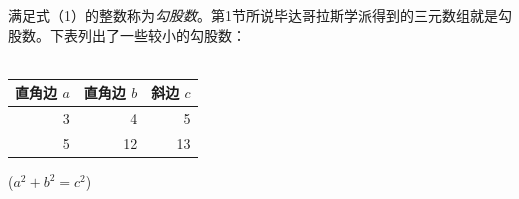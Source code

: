 \documentclass[UTF8,12pt]{ctexart} %
\begin{document}
满足式（1）的整数称为\emph{勾股数}。第1节所说毕达哥拉斯学派得到的三元数组就是勾股数。下表列出了一些较小的勾股数：
\\
\\
\begin{table}[H]
  \begin{tabular}{|rrr|}
    \hline
    直角边 $a$ & 直角边 $b$ & 斜边 $c$ \\
    \hline
    3 & 4 & 5\\
    5 & 12 & 13\\
    \hline
  \end{tabular}
  \qquad
  ($a^2+b^2=c^2$)
\end{table}

\nocite{Kline}
 
\end{document}
